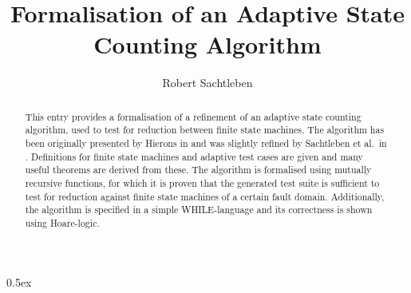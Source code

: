 \documentclass[8pt,a4paper]{article}
\begin{document}
\title{Formalisation of an Adaptive State Counting Algorithm}
\author{Robert Sachtleben}
\maketitle


\begin{abstract}
    This entry provides a formalisation of a refinement of an adaptive state counting algorithm, used to test for reduction between finite state machines. The algorithm has been originally presented by Hierons in \cite{hierons} and was slightly refined by Sachtleben et al.\ in \cite{refinement}.
    Definitions for finite state machines and adaptive test cases are given and many useful theorems are derived from these.
    The algorithm is formalised using mutually recursive functions, for which it is proven that the generated test suite is sufficient to test for reduction against finite state machines of a certain fault domain.
    Additionally, the algorithm is specified in a simple WHILE-language and its correctness is shown using Hoare-logic.
\end{abstract}


\tableofcontents

\parindent 0pt\parskip 0.5ex





\end{document}
